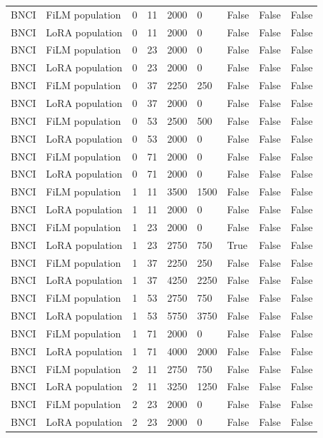 \begin{longtable}{lllllllll}
BNCI & FiLM population & 0 & 11 & 2000 & 0 & False & False & False \\
BNCI & LoRA population & 0 & 11 & 2000 & 0 & False & False & False \\
BNCI & FiLM population & 0 & 23 & 2000 & 0 & False & False & False \\
BNCI & LoRA population & 0 & 23 & 2000 & 0 & False & False & False \\
BNCI & FiLM population & 0 & 37 & 2250 & 250 & False & False & False \\
BNCI & LoRA population & 0 & 37 & 2000 & 0 & False & False & False \\
BNCI & FiLM population & 0 & 53 & 2500 & 500 & False & False & False \\
BNCI & LoRA population & 0 & 53 & 2000 & 0 & False & False & False \\
BNCI & FiLM population & 0 & 71 & 2000 & 0 & False & False & False \\
BNCI & LoRA population & 0 & 71 & 2000 & 0 & False & False & False \\
BNCI & FiLM population & 1 & 11 & 3500 & 1500 & False & False & False \\
BNCI & LoRA population & 1 & 11 & 2000 & 0 & False & False & False \\
BNCI & FiLM population & 1 & 23 & 2000 & 0 & False & False & False \\
BNCI & LoRA population & 1 & 23 & 2750 & 750 & True & False & False \\
BNCI & FiLM population & 1 & 37 & 2250 & 250 & False & False & False \\
BNCI & LoRA population & 1 & 37 & 4250 & 2250 & False & False & False \\
BNCI & FiLM population & 1 & 53 & 2750 & 750 & False & False & False \\
BNCI & LoRA population & 1 & 53 & 5750 & 3750 & False & False & False \\
BNCI & FiLM population & 1 & 71 & 2000 & 0 & False & False & False \\
BNCI & LoRA population & 1 & 71 & 4000 & 2000 & False & False & False \\
BNCI & FiLM population & 2 & 11 & 2750 & 750 & False & False & False \\
BNCI & LoRA population & 2 & 11 & 3250 & 1250 & False & False & False \\
BNCI & FiLM population & 2 & 23 & 2000 & 0 & False & False & False \\
BNCI & LoRA population & 2 & 23 & 2000 & 0 & False & False & False \\

\end{longtable}
